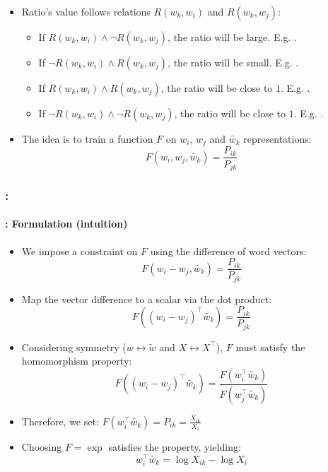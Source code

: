 \documentclass[xcolor=table]{beamer}
\begin{document}
\begin{frame}
	\begin{itemize}
		\item Ratio's value follows relations $R(w_k, w_i)$ and $R(w_k, w_j)$:
		\begin{itemize}
			\item If $R(w_k, w_i) \wedge \neg R(w_k, w_j)$, the ratio will be large. E.g. .
			\item If $\neg R(w_k, w_i) \wedge R(w_k, w_j)$, the ratio will be small. E.g. .
			\item If $R(w_k, w_i) \wedge R(w_k, w_j)$, the ratio will be close to $1$. E.g. .
			\item If $\neg R(w_k, w_i) \wedge \neg R(w_k, w_j)$, the ratio will be close to $1$. E.g. .
		\end{itemize}
		\item The idea is to train a function $F$ on $w_i$, $w_j$ and $\tilde{w_k}$ representations:
		\[F(w_i, w_j, \tilde{w_k}) = \frac{P_{ik}}{P_{jk}}\]
	\end{itemize}
	
\end{frame}

\begin{frame}
	\frametitle{\insertshortsubtitle: \insertsection}
	\framesubtitle{\insertsubsection: Formulation (intuition)}
	
	\begin{itemize}
		\item We impose a constraint on $F$ using the difference of word vectors:
		\[
		F(w_i - w_j, \tilde{w_k}) = \frac{P_{ik}}{P_{jk}}
		\]
		\item Map the vector difference to a scalar via the dot product:
		\[
		F((w_i - w_j)^\top \tilde{w_k}) = \frac{P_{ik}}{P_{jk}}
		\]
		\item Considering symmetry ($w \leftrightarrow \tilde{w}$ and $X \leftrightarrow X^\top$), 
		$F$ must satisfy the homomorphism property:
		\[
		F((w_i - w_j)^\top \tilde{w_k}) = \frac{F(w_i^\top \tilde{w_k})}{F(w_j^\top \tilde{w_k})}
		\]
		\item Therefore, we set:
		$F(w_i^\top \tilde{w_k}) = P_{ik} = \frac{X_{ik}}{X_i}$
	
		\item Choosing $F = \exp$ satisfies the property, yielding:
		\[w_i^\top \tilde{w_k} = \log X_{ik} - \log X_i\]
		
	\end{itemize}
	
	
\end{frame}
\end{document}
